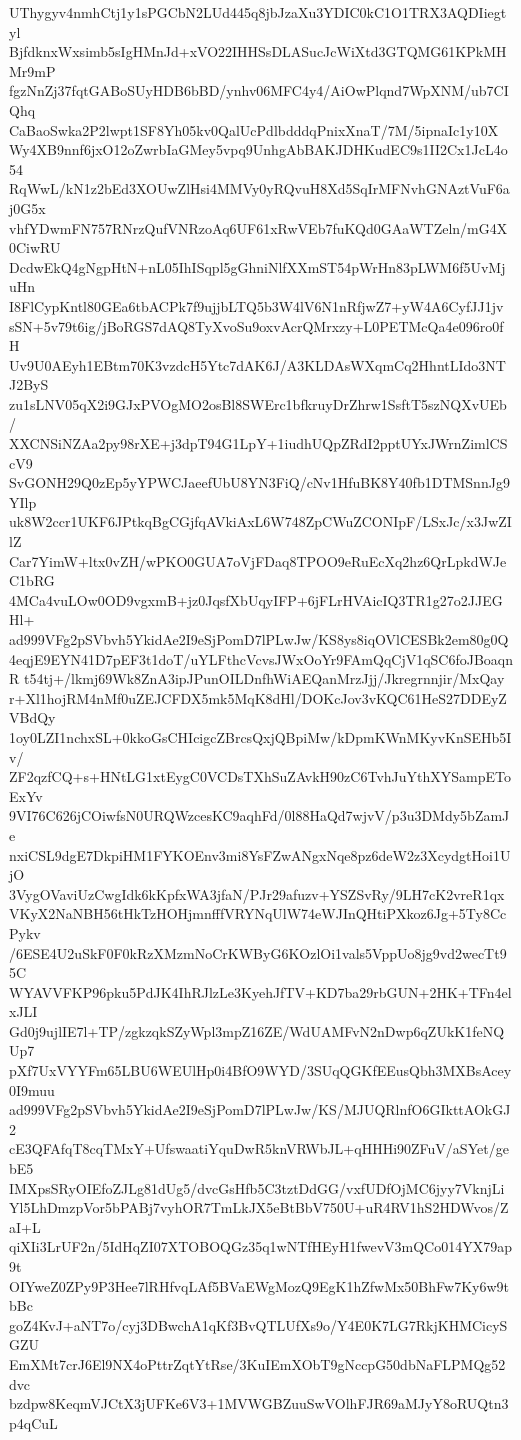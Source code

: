 UThygyv4nmhCtj1y1sPGCbN2LUd445q8jbJzaXu3YDIC0kC1O1TRX3AQDIiegtyl
BjfdknxWxsimb5sIgHMnJd+xVO22IHHSsDLASucJcWiXtd3GTQMG61KPkMHMr9mP
fgzNnZj37fqtGABoSUyHDB6bBD/ynhv06MFC4y4/AiOwPlqnd7WpXNM/ub7CIQhq
CaBaoSwka2P2lwpt1SF8Yh05kv0QalUcPdlbdddqPnixXnaT/7M/5ipnaIc1y10X
Wy4XB9nnf6jxO12oZwrbIaGMey5vpq9UnhgAbBAKJDHKudEC9s1II2Cx1JcL4o54
RqWwL/kN1z2bEd3XOUwZlHsi4MMVy0yRQvuH8Xd5SqIrMFNvhGNAztVuF6aj0G5x
vhfYDwmFN757RNrzQufVNRzoAq6UF61xRwVEb7fuKQd0GAaWTZeln/mG4X0CiwRU
DcdwEkQ4gNgpHtN+nL05IhISqpl5gGhniNlfXXmST54pWrHn83pLWM6f5UvMjuHn
I8FlCypKntl80GEa6tbACPk7f9ujjbLTQ5b3W4lV6N1nRfjwZ7+yW4A6CyfJJ1jv
sSN+5v79t6ig/jBoRGS7dAQ8TyXvoSu9oxvAcrQMrxzy+L0PETMcQa4e096ro0fH
Uv9U0AEyh1EBtm70K3vzdcH5Ytc7dAK6J/A3KLDAsWXqmCq2HhntLIdo3NTJ2ByS
zu1sLNV05qX2i9GJxPVOgMO2osBl8SWErc1bfkruyDrZhrw1SsftT5szNQXvUEb/
XXCNSiNZAa2py98rXE+j3dpT94G1LpY+1iudhUQpZRdI2pptUYxJWrnZimlCScV9
SvGONH29Q0zEp5yYPWCJaeefUbU8YN3FiQ/cNv1HfuBK8Y40fb1DTMSnnJg9YIlp
uk8W2ccr1UKF6JPtkqBgCGjfqAVkiAxL6W748ZpCWuZCONIpF/LSxJc/x3JwZIlZ
Car7YimW+ltx0vZH/wPKO0GUA7oVjFDaq8TPOO9eRuEcXq2hz6QrLpkdWJeC1bRG
4MCa4vuLOw0OD9vgxmB+jz0JqsfXbUqyIFP+6jFLrHVAicIQ3TR1g27o2JJEGHl+
ad999VFg2pSVbvh5YkidAe2I9eSjPomD7lPLwJw/KS8ys8iqOVlCESBk2em80g0Q
4eqjE9EYN41D7pEF3t1doT/uYLFthcVcvsJWxOoYr9FAmQqCjV1qSC6foJBoaqnR
t54tj+/lkmj69Wk8ZnA3ipJPunOILDnfhWiAEQanMrzJjj/Jkregrnnjir/MxQay
r+Xl1hojRM4nMf0uZEJCFDX5mk5MqK8dHl/DOKcJov3vKQC61HeS27DDEyZVBdQy
1oy0LZI1nchxSL+0kkoGsCHIcigcZBrcsQxjQBpiMw/kDpmKWnMKyvKnSEHb5Iv/
ZF2qzfCQ+s+HNtLG1xtEygC0VCDsTXhSuZAvkH90zC6TvhJuYthXYSampEToExYv
9VI76C626jCOiwfsN0URQWzcesKC9aqhFd/0l88HaQd7wjvV/p3u3DMdy5bZamJe
nxiCSL9dgE7DkpiHM1FYKOEnv3mi8YsFZwANgxNqe8pz6deW2z3XcydgtHoi1UjO
3VygOVaviUzCwgIdk6kKpfxWA3jfaN/PJr29afuzv+YSZSvRy/9LH7cK2vreR1qx
VKyX2NaNBH56tHkTzHOHjmnfffVRYNqUlW74eWJInQHtiPXkoz6Jg+5Ty8CcPykv
/6ESE4U2uSkF0F0kRzXMzmNoCrKWByG6KOzlOi1vals5VppUo8jg9vd2wecTt95C
WYAVVFKP96pku5PdJK4IhRJlzLe3KyehJfTV+KD7ba29rbGUN+2HK+TFn4elxJLI
Gd0j9ujlIE7l+TP/zgkzqkSZyWpl3mpZ16ZE/WdUAMFvN2nDwp6qZUkK1feNQUp7
pXf7UxVYYFm65LBU6WEUlHp0i4BfO9WYD/3SUqQGKfEEusQbh3MXBsAcey0I9muu
ad999VFg2pSVbvh5YkidAe2I9eSjPomD7lPLwJw/KS/MJUQRlnfO6GIkttAOkGJ2
cE3QFAfqT8cqTMxY+UfswaatiYquDwR5knVRWbJL+qHHHi90ZFuV/aSYet/gebE5
IMXpsSRyOIEfoZJLg81dUg5/dvcGsHfb5C3tztDdGG/vxfUDfOjMC6jyy7VknjLi
Yl5LhDmzpVor5bPABj7vyhOR7TmLkJX5eBtBbV750U+uR4RV1hS2HDWvos/ZaI+L
qiXIi3LrUF2n/5IdHqZI07XTOBOQGz35q1wNTfHEyH1fwevV3mQCo014YX79ap9t
OIYweZ0ZPy9P3Hee7lRHfvqLAf5BVaEWgMozQ9EgK1hZfwMx50BhFw7Ky6w9tbBc
goZ4KvJ+aNT7o/cyj3DBwchA1qKf3BvQTLUfXs9o/Y4E0K7LG7RkjKHMCicySGZU
EmXMt7crJ6El9NX4oPttrZqtYtRse/3KuIEmXObT9gNccpG50dbNaFLPMQg52dvc
bzdpw8KeqmVJCtX3jUFKe6V3+1MVWGBZuuSwVOlhFJR69aMJyY8oRUQtn3p4qCuL
